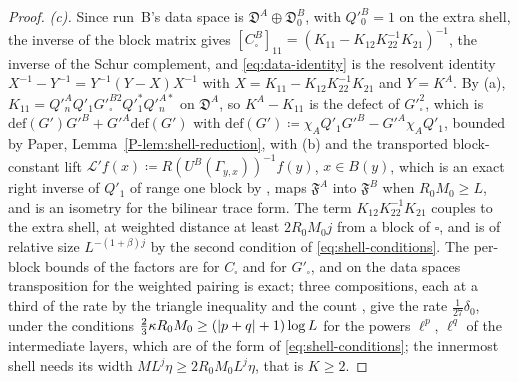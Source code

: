 \documentclass[11pt]{preprint}
\DeclarePairedDelimiter{\abs}{\lvert}{\rvert}
\numberwithin{equation}{section}
\theoremstyle{definition}
\theoremstyle{remark}
\theoremstyle{plain}
\begin{document}
\begin{proof}
\emph{(c).} Since run~B's data space is $\mathfrak D^A \oplus \mathfrak D^B_0$, with $Q'^B_0 = 1$ on the extra shell, the inverse of the block matrix gives $[C^B_\square]_{11} = (K_{11} - K_{12}K_{22}^{-1}K_{21})^{-1}$, the inverse of the Schur complement, and \eqref{eq:data-identity} is the resolvent identity $X^{-1} - Y^{-1} = Y^{-1}(Y - X)X^{-1}$ with $X = K_{11} - K_{12}K_{22}^{-1}K_{21}$ and $Y = K^A$. By (a), $K_{11} = Q'^A_nQ'_1G'^{B2}_\square Q'^*_1Q'^{A*}_n$ on $\mathfrak D^A$, so $K^A - K_{11}$ is the defect of $G'^2_\square$, which is $\mathrm{def}(G')G'^B + G'^A\mathrm{def}(G')$ with $\mathrm{def}(G') \coloneqq \chi_AQ'_1G'^B - G'^A\chi_AQ'_1$, bounded by Paper, Lemma~\ref{P-lem:shell-reduction}, with (b) and the transported block-constant lift $\mathcal L'f(x) \coloneqq R(U^B(\Gamma_{y,x}))^{-1}f(y)$, $x \in B(y)$, which is an exact right inverse of $Q'_1$ of range one block by \cite[(3.19)]{BalabanPBG}, maps $\mathfrak F^A$ into $\mathfrak F^B$ when $R_0M_0 \geq L$, and is an isometry for the bilinear trace form. The term $K_{12}K_{22}^{-1}K_{21}$ couples to the extra shell, at weighted distance at least $2R_0M_0j$ from a block of $\square$, and is of relative size $L^{-(1+\beta)j}$ by the second condition of \eqref{eq:shell-conditions}. The per-block bounds of the factors are \cite[(3.48), Theorem~3.2, p.~398]{BalabanPBG} for $C_\square$ and \cite[(3.42)]{BalabanPBG} for $G'_\square$, and on the data spaces transposition for the weighted pairing is exact; three compositions, each at a third of the rate by the triangle inequality and the count \cite[(2.58)]{BalabanPRT2}, give the rate $\frac{1}{27}\delta_0$, under the conditions $\frac23\kappa R_0M_0 \geq (\abs{p + q} + 1)\log L$ for the powers $\ell^p$, $\ell^q$ of the intermediate layers, which are of the form of \eqref{eq:shell-conditions}; the innermost shell needs its width $ML^j\eta \geq 2R_0M_0L^j\eta$, that is $K \geq 2$.


\end{proof}
\end{document}

